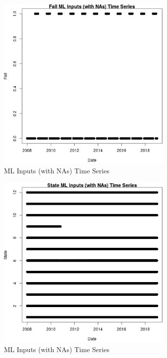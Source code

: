 \begin{figure} 
\centering  
\includegraphics[width=0.77\textwidth]{Code_Outputs/Report_ML_input_PM25_Step4_part_f_de_duplicated_aveswNAs_FallvDate.jpg} 
\caption{\label{fig:Report_ML_input_PM25_Step4_part_f_de_duplicated_aveswNAsFallvDate}ML Inputs (with NAs) Time Series} 
\end{figure} 
 

\begin{figure} 
\centering  
\includegraphics[width=0.77\textwidth]{Code_Outputs/Report_ML_input_PM25_Step4_part_f_de_duplicated_aveswNAs_StatevDate.jpg} 
\caption{\label{fig:Report_ML_input_PM25_Step4_part_f_de_duplicated_aveswNAsStatevDate}ML Inputs (with NAs) Time Series} 
\end{figure} 
 

